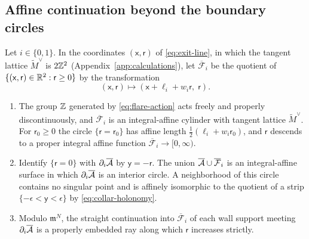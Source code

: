 \subsection{Affine continuation beyond the boundary circles}

\begin{proposition}\label{prop:outward-flares}
Let $i\in\{0,1\}$.  In the coordinates $(\mathsf x,\mathsf r)$ of
\eqref{eq:exit-line}, in which the tangent lattice $\widetilde M^\vee$ is
$2\mathbb Z^2$ (Appendix~\ref{app:calculations}), let $\overline{\mathcal F}_i$ be
the quotient of $\{(\mathsf x,\mathsf r)\in\mathbb R^2:\mathsf r\geq0\}$ by the
transformation
\begin{equation}\label{eq:flare-action}
 (\mathsf x,\mathsf r)\longmapsto(\mathsf x+\ell_i+w_i\mathsf r,\;\mathsf r).
\end{equation}
\begin{enumerate}
\item The group $\mathbb Z$ generated by \eqref{eq:flare-action} acts freely and
properly discontinuously, and $\overline{\mathcal F}_i$ is an
integral-affine cylinder with tangent lattice $\widetilde M^\vee$.  For
$\mathsf r_0\geq0$ the circle $\{\mathsf r=\mathsf r_0\}$ has affine length
$\frac12(\ell_i+w_i\mathsf r_0)$, and $\mathsf r$ descends to a proper
integral affine function $\overline{\mathcal F}_i\to[0,\infty)$.
\item Identify $\{\mathsf r=0\}$ with $\partial_i\overline{\mathcal A}$ by
$\mathsf y=-\mathsf r$.  The union
$\overline{\mathcal A}\cup\overline{\mathcal F}_i$ is an integral-affine surface
in which $\partial_i\overline{\mathcal A}$ is an interior circle.  A
neighborhood of this circle contains no singular point and is affinely
isomorphic to the quotient of a strip $\{-\epsilon<\mathsf y<\epsilon\}$
by \eqref{eq:collar-holonomy}.
\item Modulo $\mathfrak m^N$, the straight continuation into
$\overline{\mathcal F}_i$ of each wall support meeting $\partial_i\overline{\mathcal A}$ is a properly
embedded ray along which $\mathsf r$ increases strictly.
\end{enumerate}
\end{proposition}

